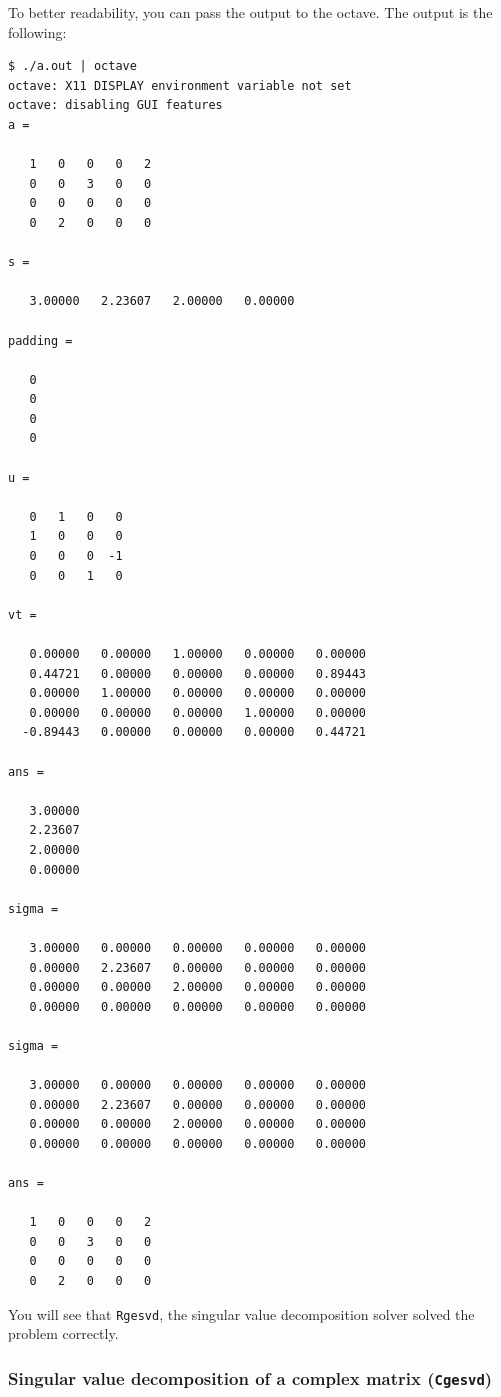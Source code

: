 \documentclass[12pt]{article}
\begin{document}
To better readability, you can pass the output to the octave. The output is the following:
{\footnotesize
\begin{verbatim}
$ ./a.out | octave
octave: X11 DISPLAY environment variable not set
octave: disabling GUI features
a =

   1   0   0   0   2
   0   0   3   0   0
   0   0   0   0   0
   0   2   0   0   0

s =

   3.00000   2.23607   2.00000   0.00000

padding =

   0
   0
   0
   0

u =

   0   1   0   0
   1   0   0   0
   0   0   0  -1
   0   0   1   0

vt =

   0.00000   0.00000   1.00000   0.00000   0.00000
   0.44721   0.00000   0.00000   0.00000   0.89443
   0.00000   1.00000   0.00000   0.00000   0.00000
   0.00000   0.00000   0.00000   1.00000   0.00000
  -0.89443   0.00000   0.00000   0.00000   0.44721

ans =

   3.00000
   2.23607
   2.00000
   0.00000

sigma =

   3.00000   0.00000   0.00000   0.00000   0.00000
   0.00000   2.23607   0.00000   0.00000   0.00000
   0.00000   0.00000   2.00000   0.00000   0.00000
   0.00000   0.00000   0.00000   0.00000   0.00000

sigma =

   3.00000   0.00000   0.00000   0.00000   0.00000
   0.00000   2.23607   0.00000   0.00000   0.00000
   0.00000   0.00000   2.00000   0.00000   0.00000
   0.00000   0.00000   0.00000   0.00000   0.00000

ans =

   1   0   0   0   2
   0   0   3   0   0
   0   0   0   0   0
   0   2   0   0   0
\end{verbatim}
}
You will see that {\tt Rgesvd}, the singular value decomposition solver solved the problem correctly.

\subsubsection{Singular value decomposition of a complex matrix ({\tt Cgesvd})}
\end{document}

